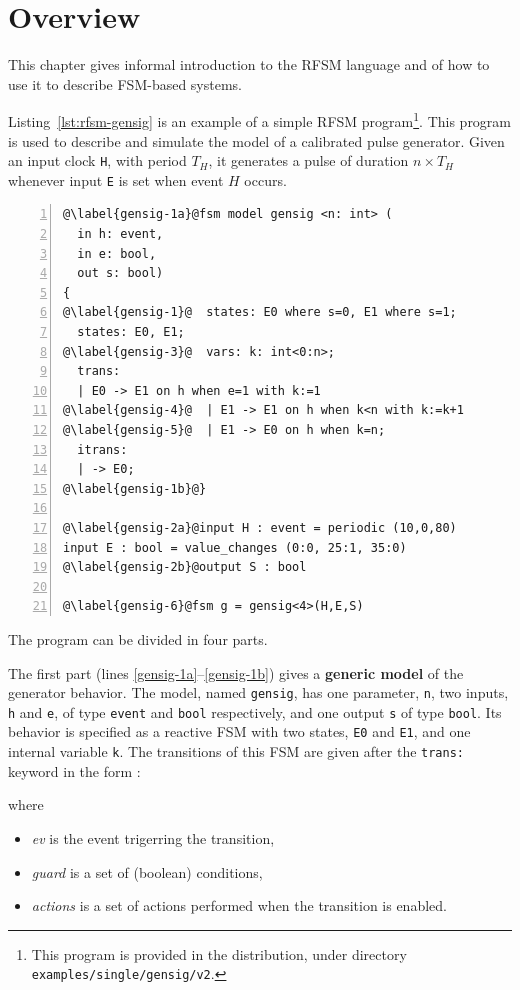 \chapter{Overview}
\label{cha:overview}

This chapter gives informal introduction to the RFSM language and of how to use it to describe 
FSM-based systems.

\medskip
Listing~\ref{lst:rfsm-gensig} is an example of a simple RFSM program\footnote{This program is
  provided in the distribution, under directory \texttt{examples/single/gensig/v2}.}. This program is
used to describe and simulate the model of a calibrated pulse generator. Given an input clock
\verb|H|, with period $T_H$, it generates a pulse of duration $n \times T_H$ whenever input
\texttt{E} is set when event $H$ occurs.

\begin{lstlisting}[language=Rfsm,frame=single,numbers=left,caption=A simple RFSM
  program,label={lst:rfsm-gensig}]
@\label{gensig-1a}@fsm model gensig <n: int> (
  in h: event,
  in e: bool,
  out s: bool)
{
@\label{gensig-1}@  states: E0 where s=0, E1 where s=1;
  states: E0, E1;
@\label{gensig-3}@  vars: k: int<0:n>;
  trans:
  | E0 -> E1 on h when e=1 with k:=1
@\label{gensig-4}@  | E1 -> E1 on h when k<n with k:=k+1
@\label{gensig-5}@  | E1 -> E0 on h when k=n;
  itrans:
  | -> E0;
@\label{gensig-1b}@}

@\label{gensig-2a}@input H : event = periodic (10,0,80)
input E : bool = value_changes (0:0, 25:1, 35:0)
@\label{gensig-2b}@output S : bool 

@\label{gensig-6}@fsm g = gensig<4>(H,E,S)
\end{lstlisting}

\medskip
The program can be divided in four parts.

\medskip The first part (lines \ref{gensig-1a}--\ref{gensig-1b}) gives a \textbf{generic model} of
the generator behavior. The model, named \verb|gensig|, has one parameter, \verb|n|, two inputs,
\verb|h| and \verb|e|, of type \verb|event| and \verb|bool| respectively, and one output \verb|s| of
type \verb|bool|. Its behavior is specified as a reactive FSM with two states, \verb|E0| and
\verb|E1|, and one internal variable \verb|k|. The transitions of this FSM are given after the
\verb|trans:| keyword in the form :
\begin{center}
\end{center}
where
\begin{itemize}
\item \emph{ev} is the event trigerring the transition,
\item \emph{guard} is a set of (boolean) conditions,
\item \emph{actions} is a set of actions performed when the transition is enabled.
\end{itemize}

